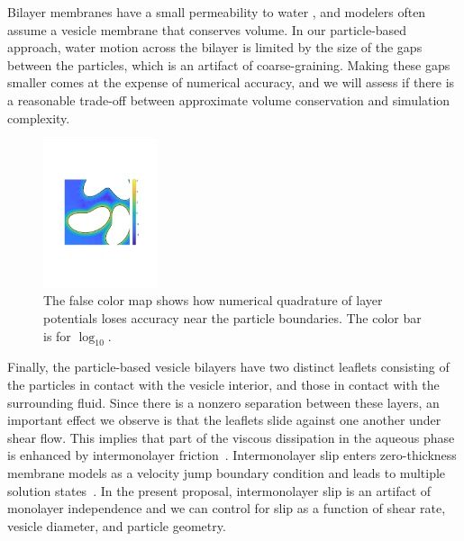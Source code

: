 Bilayer membranes have a small permeability to water
\cite{323e9a2f0c58487ea82518d7a1f96485}, and modelers often assume a
vesicle membrane that conserves volume. In our particle-based approach,
water motion across the bilayer is limited by the size of the gaps
between the particles, which is an artifact of coarse-graining.  Making
these gaps smaller comes at the expense of numerical accuracy, and we
will assess if there is a reasonable trade-off between approximate
volume conservation and simulation complexity. 

\begin{figure}
\centerline{\includegraphics[width=0.30\textwidth]{figures/BIError.pdf}}
  \vspace{-8pt}
\caption{
\label{fig:bierror}  
\footnotesize The false color map shows how numerical quadrature of
  layer potentials loses accuracy near the particle boundaries.  The
  color bar is for $\log_{10}.$}
\end{figure}

Finally, the particle-based vesicle bilayers have two distinct leaflets
consisting of the particles in contact with the vesicle interior, and
those in contact with the surrounding fluid. Since there is a nonzero
separation between these layers, an important effect we observe is that
the leaflets slide against one another under shear flow.  This implies
that part of the viscous dissipation in the aqueous phase is enhanced by
intermonolayer friction~\cite{SHKULIPA2005823, ShkulipaThesis}.
Intermonolayer slip enters zero-thickness membrane models as a velocity
jump boundary condition and leads to multiple solution
states~\cite{schwalbe_vlahovska_miksis_2010}.  In the present proposal,
intermonolayer slip is an artifact of monolayer independence  and we can
control for slip as a function of shear rate, vesicle diameter, and
particle geometry.

